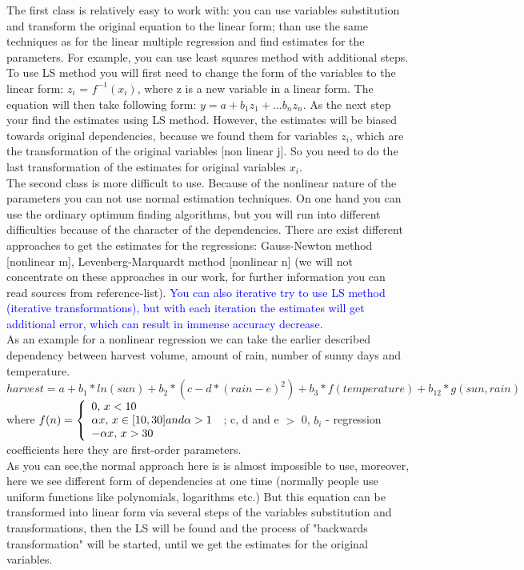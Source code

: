 \documentclass[12pt, a4paper]{article}
\begin{document}
The first class is relatively easy to work with: you can use variables substitution and transform the original equation to the linear form; than use the same techniques as for the linear multiple regression and find estimates for the parameters. For example, you can use least squares method with additional steps. To use LS method you will first need to change the form of the variables to the linear form: $z_{i}$ = $f^{-1}(x_{i})$, where z is a new variable in a linear form. The equation will then take following form: $y=a+b_{1}z_{1}+...b_{n}z_{n}$. As the next step your find the estimates using LS method. However, the estimates will be biased towards original dependencies, because we found them for variables $z_{i}$, which are the transformation of the original variables [non linear j]. So you need to do the last transformation of the estimates for original variables $x_{i}$.\\
The second class is more difficult to use. Because of the nonlinear nature of the parameters you can not use normal estimation techniques. On one hand you can use the ordinary optimum finding algorithms, but you will run into different difficulties because of the character of the dependencies. There are exist different approaches to get the estimates for the regressions: Gauss-Newton method [nonlinear m],  Levenberg-Marquardt method [nonlinear n] (we will not concentrate on these approaches in our work, for further information you can read sources from reference-list). \textcolor{blue}{You can also iterative try to use LS method (iterative transformations), but with each iteration the estimates will get additional error, which can result in immense accuracy decrease}. \\
As an example for a nonlinear regression we can take the earlier described dependency between harvest volume, amount of rain, number of sunny days and temperature.
\[harvest = a + b_{1}*ln(sun) + b_{2}*(c-d*(rain-e)^2) +b_{3}*f(temperature) + b_{12}*g(sun, rain)\]
where $f(n) = \left\{ 
  \begin{array}{l l}
  	0,\thinspace x < 10 \\
    \alpha x, \thinspace x \in [10, 30] and \alpha > 1 \\
    -\alpha x,\thinspace x > 30
  \end{array} \right.$ ; c, d and e $>$ 0, $b_{i}$ - regression coefficients here they are first-order parameters. \\
As you can see,the normal approach here is is almost impossible to use, moreover, here we see different form of dependencies at one time (normally people use uniform functions like polynomials, logarithms etc.) But this equation can be transformed into linear form via several steps of the variables substitution and transformations, then the LS will be found and the process of "backwards transformation" will be started, until we get the estimates for the original variables.
\end{document}
